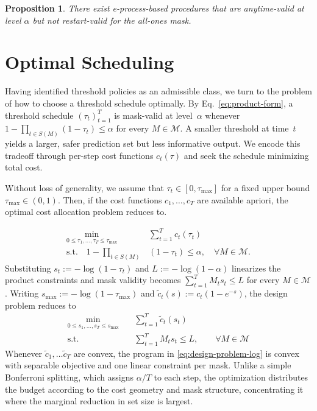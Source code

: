 \documentclass{uai2026} %
\newtheorem{proposition}[theorem]{Proposition}
\newcommand{\1}{\mathbf{1}}
\newcommand{\mcal}{\mathcal{M}}
\begin{document}
\begin{proposition}
  \label{prop:e-process-not-restart}
  There exist e-process-based procedures that are anytime-valid at level $\alpha$ but not restart-valid for the all-ones mask.
\end{proposition}

\section{Optimal Scheduling}
\label{sec:finite}
\label{sec:optimal_schedule}

Having identified threshold policies as an admissible class, we turn to the problem of how to choose a threshold schedule optimally. By Eq.~\eqref{eq:product-form}, a threshold schedule $(\tau_t)_{t=1}^T$ is mask-valid at level~$\alpha$ whenever $1 - \prod_{t \in S(M)}(1-\tau_t) \le \alpha$ for every $M \in \mcal$. A smaller threshold at time~$t$ yields a larger, safer prediction set but less informative output.
We encode this tradeoff through per-step cost functions $c_t(\tau)$ and seek the schedule minimizing total cost.

Without loss of generality, we assume that $\tau_t \in [0, \tau_{\max}]$ for a fixed upper bound $\tau_{\max} \in (0,1)$. Then, if the cost functions $c_1,\ldots,c_T$ are available apriori, the optimal cost allocation problem reduces to.

\begin{equation}
  \label{eq:design-problem}
  \begin{aligned}
    \min_{0 \le \tau_{1},\dots,\tau_{T}\le \tau_{\max}}\quad & \sum_{t=1}^{T} c_t(\tau_t)\\
    \text{s.t.}\quad  1-\prod_{t\in S(M)}&(1-\tau_t)\le \alpha,\quad \forall M\in\mcal.
  \end{aligned}
\end{equation}
Substituting $s_t := -\log(1-\tau_t)$ and $L := -\log(1-\alpha)$ linearizes the product constraints and mask validity becomes $\sum_{t=1}^{T} M_t s_t \le L$ for every $M \in \mcal$.
Writing $s_{\max} := -\log(1-\tau_{\max})$ and $\tilde{c}_t(s) := c_t(1 - e^{-s})$, the design problem reduces to
\begin{equation}
  \label{eq:design-problem-log}
  \begin{aligned}
    \min_{0 \le s_{1},\dots,s_{T}\le s_{\max}}\quad & \sum_{t=1}^{T} \tilde{c}_t(s_t)\\
    \text{s.t.}\quad & \sum_{t=1}^{T} M_t s_t \le L,\qquad \forall M\in\mcal
  \end{aligned}
\end{equation}
Whenever $\tilde{c}_1,\ldots\tilde{c}_T$ are convex, the program in \ref{eq:design-problem-log} is convex with separable objective and one linear constraint per mask.
Unlike a simple Bonferroni splitting, which assigns $\alpha/T$ to each step, the optimization distributes the budget according to the cost geometry and mask structure, concentrating it where the marginal reduction in set size is largest.
\end{document}
